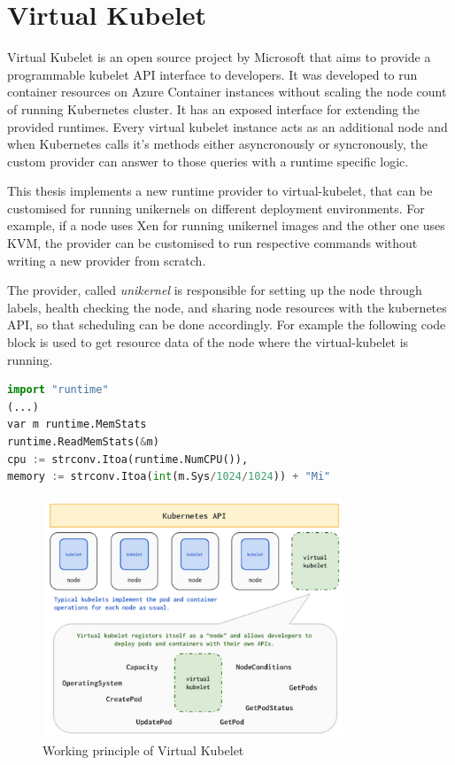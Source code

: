 \section{Virtual Kubelet}
Virtual Kubelet\cite{virtual} is an open source project by Microsoft that aims to provide a programmable kubelet API interface to developers. It was developed to run container resources on Azure Container instances without scaling the node count of running Kubernetes cluster. It has an exposed interface for extending the provided runtimes. Every virtual kubelet instance acts as an additional node and when Kubernetes calls it's methods either asyncronously or syncronously, the custom provider can answer to those queries with a runtime specific logic.

This thesis implements a new runtime provider to virtual-kubelet, that can be customised for running unikernels on different deployment environments. For example, if a node uses Xen for running unikernel images and the other one uses KVM, the provider can be customised to run respective commands without writing a new provider from scratch. 

The provider, called \textit{unikernel} is responsible for setting up the node through labels, health checking the node, and sharing node resources with the kubernetes API, so that scheduling can be done accordingly. For example the following code block is used to get resource data of the node where the virtual-kubelet is running.


\begin{lstlisting}[language=python,caption={Get Environment data},captionpos=b]
import "runtime"
(...)
var m runtime.MemStats
runtime.ReadMemStats(&m)
cpu := strconv.Itoa(runtime.NumCPU()),
memory := strconv.Itoa(int(m.Sys/1024/1024)) + "Mi"

\end{lstlisting}



\begin{figure}[htpb]
  \centering
  \includegraphics[width=0.8\textwidth]{figures/vk.png}
  \caption{Working principle of Virtual Kubelet \cite{virtual}} \label{fig:vk}
\end{figure}


